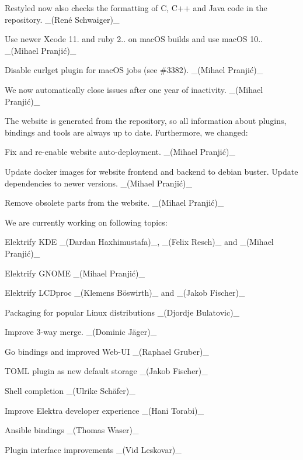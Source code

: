 \begin{DoxyItemize}
\item Restyled now also checks the formatting of C, C++ and Java code in the repository. \+\_\+(René Schwaiger)\+\_\+
\end{DoxyItemize}


\begin{DoxyItemize}
\item Use newer Xcode 11. and ruby 2.. on mac\+OS builds and use mac\+OS 10.. \+\_\+(Mihael Pranjić)\+\_\+
\item Disable curlget plugin for mac\+OS jobs (see \#3382). \+\_\+(Mihael Pranjić)\+\_\+
\end{DoxyItemize}


\begin{DoxyItemize}
\item We now automatically close issues after one year of inactivity. \+\_\+(Mihael Pranjić)\+\_\+
\end{DoxyItemize}

The website is generated from the repository, so all information about plugins, bindings and tools are always up to date. Furthermore, we changed\+:


\begin{DoxyItemize}
\item Fix and re-\/enable website auto-\/deployment. \+\_\+(Mihael Pranjić)\+\_\+
\item Update docker images for website frontend and backend to debian buster. Update dependencies to newer versions. \+\_\+(Mihael Pranjić)\+\_\+
\item Remove obsolete parts from the website. \+\_\+(Mihael Pranjić)\+\_\+
\end{DoxyItemize}

We are currently working on following topics\+:


\begin{DoxyItemize}
\item Elektrify K\+DE \+\_\+(\+Dardan Haxhimustafa)\+\_\+, \+\_\+(\+Felix Resch)\+\_\+ and \+\_\+(Mihael Pranjić)\+\_\+
\item Elektrify G\+N\+O\+ME \+\_\+(Mihael Pranjić)\+\_\+
\item Elektrify L\+C\+Dproc \+\_\+(Klemens Böswirth)\+\_\+ and \+\_\+(\+Jakob Fischer)\+\_\+
\item Packaging for popular Linux distributions \+\_\+(\+Djordje Bulatovic)\+\_\+
\item Improve 3-\/way merge. \+\_\+(Dominic Jäger)\+\_\+
\item Go bindings and improved Web-\/\+UI \+\_\+(\+Raphael Gruber)\+\_\+
\item T\+O\+ML plugin as new default storage \+\_\+(\+Jakob Fischer)\+\_\+
\item Shell completion \+\_\+(Ulrike Schäfer)\+\_\+
\item Improve Elektra developer experience \+\_\+(\+Hani Torabi)\+\_\+
\item Ansible bindings \+\_\+(\+Thomas Waser)\+\_\+
\item Plugin interface improvements \+\_\+(\+Vid Leskovar)\+\_\+
\end{DoxyItemize}

